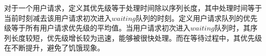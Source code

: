 对于一个用户请求，定义其优先级等于处理时间除以序列长度，其中处理时间等于当前时刻减去该用户请求初次进入$waiting$队列的时刻。定义用户请求队列的优先级等于所有用户请求优先级的平均值。当用户请求初次进入$waiting$队列时，其序列长度较短，优先级增长较为迅速，能够被很快处理。而在等待过程中，其优先级在不断提升，避免了饥饿现象。 \par

